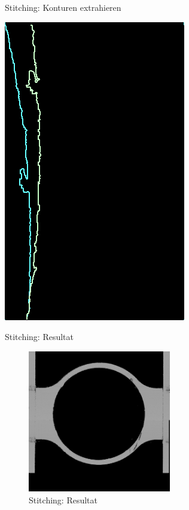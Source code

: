 \documentclass[../slides.tex]{subfiles}
\begin{document}
\begin{frame}{Stitching: Konturen extrahieren}
\begin{minipage}[H]{.2\textwidth}
    \end{minipage}
    \begin{minipage}[H]{.2\textwidth}
        \centering
        \includegraphics[width=\textwidth]{img_niklas/570_match.png}
    \end{minipage}

\end{frame}

\begin{frame}{Stitching: Resultat}
    \begin{figure}
        \centering
        \includegraphics[height=175pt]{img_niklas/am_sp0_stitched_2.png}
        \caption{Stitching: Resultat}
        \label{fig:cons}
    \end{figure}
\end{frame}
\end{document}
